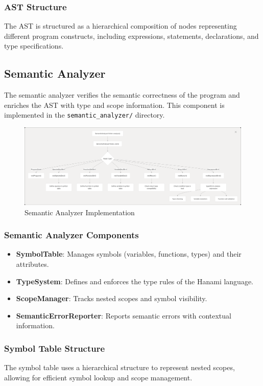 \documentclass[conference]{IEEEtran}
\begin{document}
\subsubsection{AST Structure}
The AST is structured as a hierarchical composition of nodes representing different program constructs, including expressions, statements, declarations, and type specifications.

\subsection{Semantic Analyzer}
The semantic analyzer verifies the semantic correctness of the program and enriches the AST with type and scope information. This component is implemented in the \texttt{semantic\_analyzer/} directory.
\begin{figure}[H]
        \centering
        \includegraphics[width=1\linewidth]{seman_imp.png}
        \caption{Semantic Analyzer Implementation}
        \label{fig:enter-label}
    \end{figure}
\subsubsection{Semantic Analyzer Components}
\begin{itemize}
    \item \textbf{SymbolTable}: Manages symbols (variables, functions, types) and their attributes.
    \item \textbf{TypeSystem}: Defines and enforces the type rules of the Hanami language.
    \item \textbf{ScopeManager}: Tracks nested scopes and symbol visibility.
    \item \textbf{SemanticErrorReporter}: Reports semantic errors with contextual information.
\end{itemize}

\subsubsection{Symbol Table Structure}
The symbol table uses a hierarchical structure to represent nested scopes, allowing for efficient symbol lookup and scope management.
\end{document}
